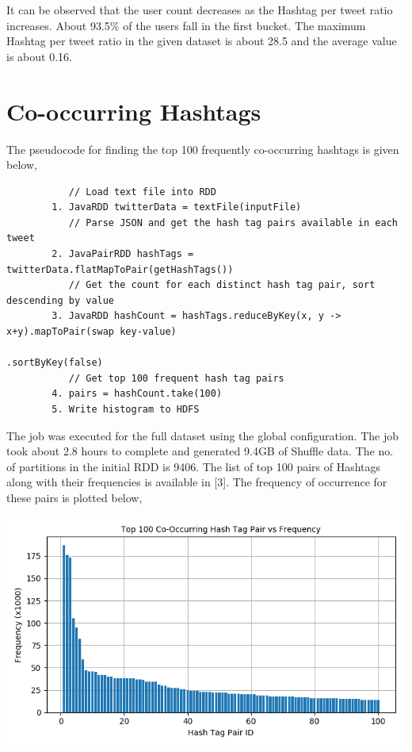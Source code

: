 \documentclass[11pt,a4paper,oneside]{article}
\begin{document}
	It can be observed that the user count decreases as the Hashtag per tweet ratio increases. About 93.5\% of the users fall in the first bucket. The maximum Hashtag per tweet ratio in the given dataset is about 28.5 and the average value is about 0.16.
	
	\section{Co-occurring Hashtags}
	The pseudocode for finding the top 100 frequently co-occurring hashtags is given below,
	
	\begin{verbatim}
	       // Load text file into RDD
	    1. JavaRDD twitterData = textFile(inputFile)
	       // Parse JSON and get the hash tag pairs available in each tweet
	    2. JavaPairRDD hashTags = twitterData.flatMapToPair(getHashTags()) 
	       // Get the count for each distinct hash tag pair, sort descending by value
	    3. JavaRDD hashCount = hashTags.reduceByKey(x, y -> x+y).mapToPair(swap key-value)
	                                                            .sortByKey(false)
	       // Get top 100 frequent hash tag pairs
	    4. pairs = hashCount.take(100)
	    5. Write histogram to HDFS 
	\end{verbatim}
	
	The job was executed for the full dataset using the global configuration. The job took about 2.8 hours to complete and generated 9.4GB of Shuffle data. The no. of partitions in the initial RDD is 9406. The list of top 100 pairs of Hashtags along with their frequencies is available in [3]. The frequency of occurrence for these pairs is plotted below, 
	
	\begin{center}
		\includegraphics[scale=0.6]{2.png}		
	\end{center}
\end{document}
